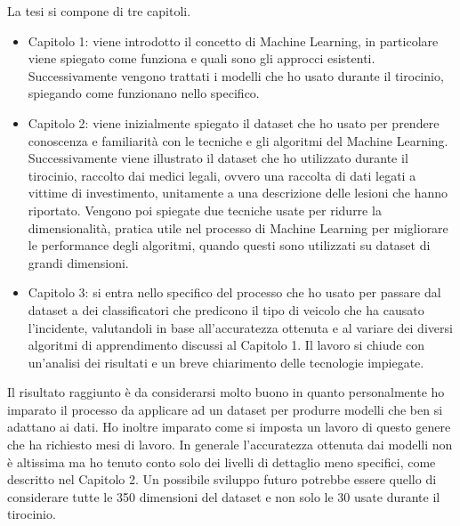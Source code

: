 \documentclass[12pt]{article}
\begin{document}
La tesi si compone di tre capitoli.
\begin{itemize}
	\item Capitolo 1: viene introdotto il concetto di Machine Learning, in particolare viene spiegato come funziona e quali sono gli approcci esistenti. Successivamente vengono trattati i modelli che ho usato durante il tirocinio, spiegando come funzionano nello specifico.
	\item Capitolo 2: viene inizialmente spiegato il dataset che ho usato per prendere conoscenza e familiarità con le tecniche e gli algoritmi del Machine Learning. Successivamente viene illustrato il dataset che ho utilizzato durante il tirocinio, raccolto dai medici legali, ovvero una raccolta di dati legati a vittime di investimento, unitamente a una descrizione delle lesioni che hanno riportato. Vengono poi spiegate due tecniche usate per ridurre la dimensionalità, pratica utile nel processo di Machine Learning per migliorare le performance degli algoritmi, quando questi sono utilizzati su dataset di grandi dimensioni.
	\item Capitolo 3: si entra nello specifico del processo che ho usato per passare dal dataset a dei classificatori che predicono il tipo di veicolo che ha causato l'incidente, valutandoli in base all'accuratezza ottenuta e al variare dei diversi algoritmi di apprendimento discussi al Capitolo 1. Il lavoro si chiude con un'analisi dei risultati e un breve chiarimento delle tecnologie impiegate.
\end{itemize}
Il risultato raggiunto è da considerarsi molto buono in quanto personalmente ho imparato il processo da applicare ad un dataset per produrre modelli che ben si adattano ai dati. Ho inoltre imparato come si imposta un lavoro di questo genere che ha richiesto mesi di lavoro. In generale l'accuratezza ottenuta dai modelli non è altissima ma ho tenuto conto solo dei livelli di dettaglio meno specifici, come descritto nel Capitolo 2. Un possibile sviluppo futuro potrebbe essere quello di considerare tutte le 350 dimensioni del dataset e non solo le 30 usate durante il tirocinio.
\end{document}
